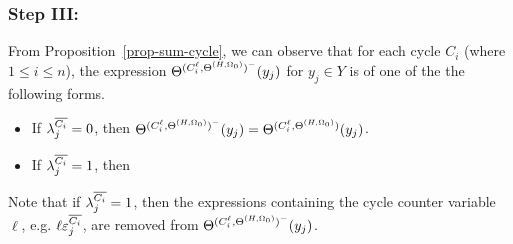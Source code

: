 \subsubsection{Step III:} 

From Proposition~\ref{prop-sum-cycle},  we can observe that for each cycle $C_i$ (where $1 \le i \le n$),  the expression $\Theta^{(C^\ell_i, \Theta^{(H,\Omega_0)})^-}(y_j)$ for $y_j \in Y$ is of one of the the following forms.
\begin{itemize}
\item If $\lambda^{\overline{C_i}}_{j}=0$, then $\Theta^{(C^\ell_i, \Theta^{(H,\Omega_0)})^{-}}(y_j) = \Theta^{(C^\ell_i, \Theta^{(H,\Omega_0)})}(y_j)$.

\item If $\lambda^{\overline{C_i}}_{j}=1$, then
%
\medskip\\
\end{itemize}
Note that if $\lambda^{\overline{C_i}}_{j}=1$, then the expressions containing the cycle counter variable $\ell$, e.g. $\ell \varepsilon^{\overline{C_i}}_j$, are removed from $\Theta^{(C^\ell_i, \Theta^{(H,\Omega_0)})^-}(y_j)$.

